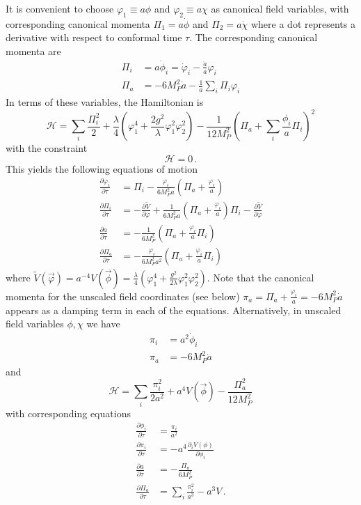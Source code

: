 It is convenient to choose $\varphi_1 \equiv a\phi$ and $\varphi_2 \equiv a\chi$ as canonical field variables, with corresponding canonical momenta $\Pi_1 = a\dot{\phi}$ and $\Pi_2=a\dot{\chi}$ where a dot represents a derivative with respect to conformal time $\tau$.
The corresponding canonical momenta are
\begin{align}
  \Pi_i &= a\dot{\phi}_i = \dot{\varphi}_i - \frac{\dot{a}}{a}\varphi_i \\
  \Pi_a &= -6M_P^2\dot{a} - \frac{1}{a}\sum_i\Pi_i\varphi_i
\end{align}
In terms of these variables, the Hamiltonian is
\begin{equation}
  \mathcal{H} = \sum_i\frac{\Pi_i^2}{2} + \frac{\lambda}{4}\left(\varphi_1^4 + \frac{2g^2}{\lambda}\varphi_1^2\varphi_2^2 \right) - \frac{1}{12 M_P^2}\left(\Pi_a + \sum_i\frac{\phi_i}{a}\Pi_i\right)^2
\end{equation}
with the constraint
\begin{equation}
  \mathcal{H} = 0 \, .
\end{equation}
This yields the following equations of motion
\begin{align}\label{eqn:eom_scale}
  \frac{\partial\varphi_i}{\partial\tau} &= \Pi_i - \frac{\varphi_i}{6M_P^2a}\left(\Pi_a + \frac{\varphi_i}{a}\right) \\
  \frac{\partial\Pi_i}{\partial\tau}     &= -\frac{\partial\tilde{V}}{\partial\varphi} +\frac{1}{6M_P^2 a}\left(\Pi_a + \frac{\varphi_i}{a}\right)\Pi_i - \frac{\partial \tilde{V}}{\partial\varphi} \\
  \frac{\partial a}{\partial\tau}        &= -\frac{1}{6M_P^2}\left(\Pi_a + \frac{\varphi_i}{a}\Pi_i\right) \\
  \frac{\partial\Pi_a}{\partial\tau}     &= -\frac{\varphi_i}{6M_P^2 a^2}\left(\Pi_a + \frac{\varphi_i}{a}\Pi_i\right)
\end{align}
where $\tilde{V}(\vec{\varphi}) = a^{-4}V(\vec{\phi}) = \frac{\lambda}{4}\left(\varphi_1^4 + \frac{g^2}{2\lambda}\varphi_1^2\varphi_2^2 \right)$.
Note that the canonical momenta for the unscaled field coordinates (see below) $\pi_a = \Pi_a + \frac{\varphi_i}{a} = -6M_P^2\dot{a}$ appears as a damping term in each of the equations.
Alternatively, in unscaled field variables $\phi,\chi$ we have
\begin{align}
  \pi_i &= a^2\dot{\phi}_i\\
  \pi_a &= -6M_P^2\dot{a} 
\end{align}
and
\begin{equation}
  \mathcal{H} = \sum_i\frac{\pi_i^2}{2a^2} + a^4V(\vec{\phi}) - \frac{\Pi_a^2}{12M_P^2}
\end{equation}
with corresponding equations
\begin{align}\label{eqn:eom_noscale}
  \frac{\partial\phi_i}{\partial\tau} &= \frac{\pi_i}{a^2} \\
  \frac{\partial\pi_i}{\partial\tau} &= -a^4 \frac{\partial_iV(\phi)}{\partial\phi_i} \\
  \frac{\partial a}{\partial\tau}     &= -\frac{\Pi_a}{6M_P^2} \\
  \frac{\partial\Pi_a}{\partial\tau}  &= \sum_i\frac{\pi_i^2}{a^3} - a^3V \, .
\end{align}

